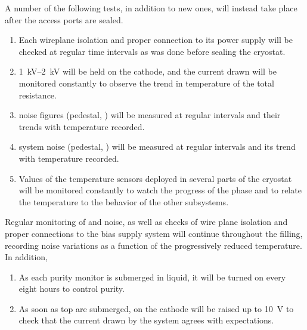 A number of the following tests, in addition to new ones, will instead take place after the access ports are sealed. 

\begin{enumerate}


    \item Each  wireplane isolation and proper connection to its  power supply will be checked at regular time intervals as was done before sealing the cryostat.
    
    \item \SIrange{1}{2}{kV} will be held on the cathode, and the current drawn will be  monitored constantly to observe the trend in temperature of the total resistance.
    
    \item {} noise figures (pedestal, ) will be measured at regular intervals and their trends with temperature recorded.
    
    \item {} system noise (pedestal, ) will be measured at regular intervals and its trend with temperature recorded.
    
     \item Values of the temperature sensors deployed in several parts of the cryostat will be monitored constantly to watch the progress of the \cooldown phase and to relate the temperature to the behavior of the other  subsystems. 
     
\end{enumerate}

Regular monitoring of  and  noise, as well as checks of wire plane isolation and proper connections to the bias supply system will continue throughout the filling, recording noise variations as a function of the progressively reduced temperature. In addition,

\begin{enumerate}

    \item As each purity monitor is submerged in liquid, it will be turned on every eight hours to control  purity. 
    
    \item As soon as top  are submerged,  on the cathode will be raised up to \SI{10}{V} to check that the current drawn by the system agrees with expectations.

\end{enumerate}

